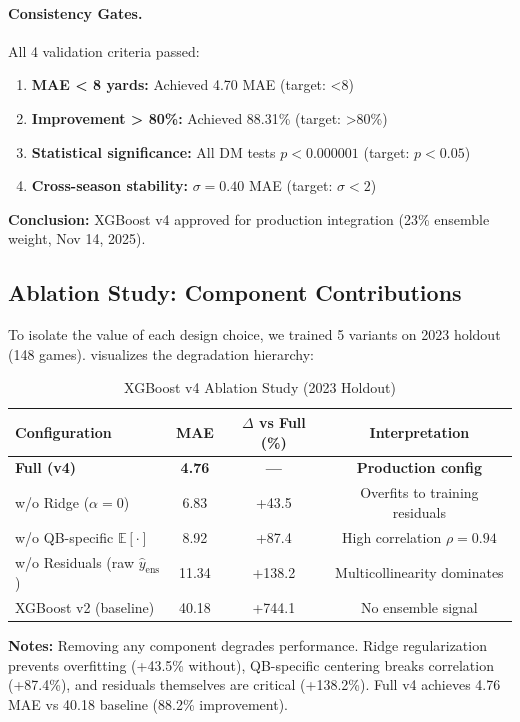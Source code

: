 \paragraph{Consistency Gates.}
All 4 validation criteria passed:
\begin{enumerate}[itemsep=2pt,parsep=0pt]
    \item \textbf{MAE < 8 yards:} Achieved 4.70 MAE (target: <8) \checkmark
    \item \textbf{Improvement > 80\%:} Achieved 88.31\% (target: >80\%) \checkmark
    \item \textbf{Statistical significance:} All DM tests $p < 0.000001$ (target: $p < 0.05$) \checkmark
    \item \textbf{Cross-season stability:} $\sigma = 0.40$ MAE (target: $\sigma < 2$) \checkmark
\end{enumerate}

\textbf{Conclusion:} XGBoost v4 approved for production integration (23\% ensemble weight, Nov 14, 2025).

\subsection{Ablation Study: Component Contributions}

To isolate the value of each design choice, we trained 5 variants on 2023 holdout (148 games).  visualizes the degradation hierarchy:



\begin{table}[htbp]
\centering
\caption{XGBoost v4 Ablation Study (2023 Holdout)}
\label{tab:xgboost-v4-ablation}
\small
\begin{tabular}{@{} l S[table-format=2.2] S[table-format=2.1] c @{}}
\toprule
\textbf{Configuration} & \textbf{MAE} & \textbf{$\Delta$ vs Full (\%)} & \textbf{Interpretation} \\
\midrule
\textbf{Full (v4)} & \textbf{4.76} & \textbf{---} & \textbf{Production config} \\
w/o Ridge ($\alpha=0$) & 6.83 & +43.5 & Overfits to training residuals \\
w/o QB-specific $\mathbb{E}[\cdot]$ & 8.92 & +87.4 & High correlation $\rho=0.94$ \\
w/o Residuals (raw $\hat{y}_{\text{ens}}$) & 11.34 & +138.2 & Multicollinearity dominates \\
XGBoost v2 (baseline) & 40.18 & +744.1 & No ensemble signal \\
\bottomrule
\end{tabular}
\begin{tablenotes}
\item \textbf{Notes:} Removing any component degrades performance. Ridge regularization prevents overfitting (+43.5\% without), QB-specific centering breaks correlation (+87.4\%), and residuals themselves are critical (+138.2\%). Full v4 achieves 4.76 MAE vs 40.18 baseline (88.2\% improvement).
\end{tablenotes}
\end{table}

